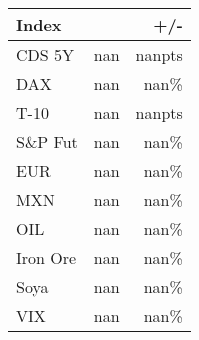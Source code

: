 \documentclass[article,crop=false]{standalone}%
\begin{document}
%
\scriptsize%
\renewcommand{\arraystretch}{1.2}%
\setlength{\tabcolsep}{0.15cm}%
\begin{tabular}{l  r  r  }%
\hline%
\textbf{Index}&\textbf{}&\textbf{+/{-}}\\%
\hline%
CDS 5Y&nan&nanpts\\%
DAX&nan&nan\%\\%
T{-}10&nan&nanpts\\%
S\&P Fut&nan&nan\%\\%
EUR&nan&nan\%\\%
MXN&nan&nan\%\\%
OIL&nan&nan\%\\%
Iron Ore&nan&nan\%\\%
Soya&nan&nan\%\\%
VIX&nan&nan\%\\%
\hline%
\end{tabular}%
\end{document}
